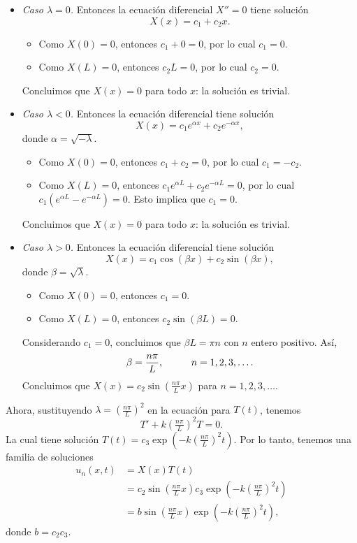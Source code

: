 \documentclass[11pt,letterpaper,draft]{report}
\newcommand\<{\langle}
\renewcommand\>{\rangle}
\begin{document}
\begin{itemize}
  \item \emph{Caso $\lambda=0$.}
  Entonces la ecuación diferencial $X''=0$ tiene solución
  \[
    X(x)=c_1+c_2x
  .\]
  \begin{itemize}
    \item
    Como $X(0)=0$, entonces $c_1+0=0$, por lo cual $c_1=0$.
    \item
    Como $X(L)=0$, entonces $c_2L=0$, por lo cual $c_2=0$.
  \end{itemize}
  Concluimos que $X(x)=0$ para todo $x$: la solución es trivial.

  \item \emph{Caso $\lambda<0$.}
  Entonces la ecuación diferencial tiene solución
  \[
    X(x) = c_1e^{\alpha x} + c_2 e^{-\alpha x}
  ,\]
  donde $\alpha=\sqrt{-\lambda}$.
  \begin{itemize}
    \item
    Como $X(0)=0$, entonces $c_1+c_2=0$, por lo cual $c_1=-c_2$.
    \item
    Como $X(L)=0$, entonces $c_1e^{\alpha L}+c_2e^{-\alpha L}=0$,
    por lo cual $c_1(e^{\alpha L}-e^{-\alpha L})=0$. Esto implica
    que $c_1=0$.
  \end{itemize}
  Concluimos que $X(x)=0$ para todo $x$: la solución es trivial.

  \item \emph{Caso $\lambda>0$.}
  Entonces la ecuación diferencial tiene solución
  \[
    X(x)= c_1\cos(\beta x)+c_2\sin(\beta x)
  ,\]
  donde $\beta=\sqrt{\lambda}$.
  \begin{itemize}
    \item Como $X(0)=0$, entonces $c_1=0$.
    \item Como $X(L)=0$, entonces $c_2\sin(\beta L)=0$.
  \end{itemize}
  Considerando $c_1=0$, concluimos que $\beta L=\pi n$ con $n$
  entero positivo. Así,
  \[
    \beta= \frac{n\pi}{L}, \hspace{10mm} n=1,2,3,\dots
  .\]
  Concluimos que
  $X(x)=c_2\sin(\tfrac{n\pi}{L}x)$ para $n=1,2,3,\dots$.
\end{itemize}

Ahora, sustituyendo $\lambda=(\tfrac{n\pi}{L})^2$ en la ecuación
para $T(t)$, tenemos
\[
  T' + k (\tfrac{n\pi}{L})^2 T = 0
.\]
La cual tiene solución $T(t)=c_3\exp(-k(\tfrac{n\pi}{L})^2t)$.
Por lo tanto, tenemos una familia de soluciones
\begin{align*}
  u_n(x,t)
  &= X(x)T(t) \\
  &= c_2\sin(\tfrac{n\pi}{L}x)c_3\exp(-k(\tfrac{n\pi}{L})^2t) \\
  &= b\sin(\tfrac{n\pi}{L}x)\exp(-k(\tfrac{n\pi}{L})^2t),
\end{align*}
donde $b=c_2c_3$.
\end{document}
